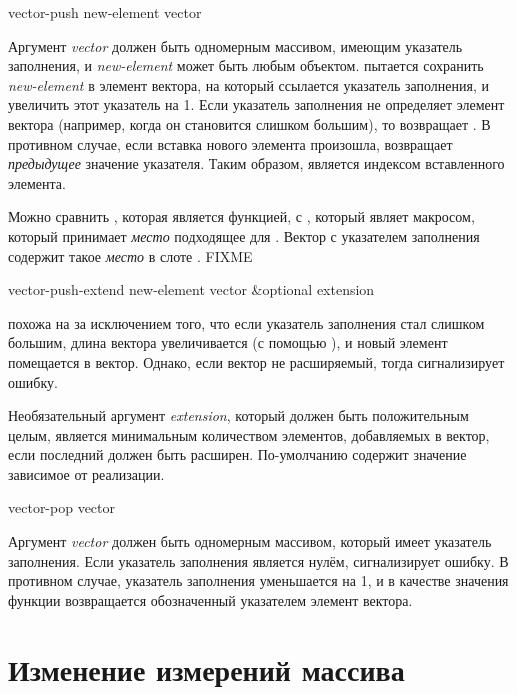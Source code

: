 \begin{defun}[Функция]
vector-push new-element vector

Аргумент \emph{vector} должен быть одномерным массивом, имеющим указатель
заполнения, и \emph{new-element} может быть любым объектом.
 пытается сохранить \emph{new-element} в элемент вектора, на
который ссылается указатель заполнения, и увеличить этот указатель на 1. Если
указатель заполнения не определяет элемент вектора (например, когда он
становится слишком большим), то  возвращает {\false}. В
противном случае, если вставка нового элемента произошла, 
возвращает \emph{предыдущее} значение указателя. Таким образом, 
является индексом вставленного элемента.

Можно сравнить , которая является функцией, с ,
который являет макросом, который принимает \emph{место} подходящее для
.
Вектор с указателем заполнения содержит такое \emph{место} в слоте
. FIXME
\end{defun}

\begin{defun}[Функция]
vector-push-extend new-element vector &optional extension

 похожа на  за исключением того, что
если указатель заполнения стал слишком большим, длина вектора увеличивается (с
помощью ), и новый элемент помещается в вектор.
Однако, если вектор не расширяемый, тогда  сигнализирует
ошибку.

Необязательный аргумент \emph{extension}, который должен быть положительным
целым, является минимальным количеством элементов, добавляемых в вектор, если
последний должен быть расширен. По-умолчанию содержит значение зависимое от
реализации.
\end{defun}

\begin{defun}[Функция]
vector-pop vector

Аргумент \emph{vector} должен быть одномерным массивом, который имеет указатель
заполнения.
Если указатель заполнения является нулём,  сигнализирует ошибку.
В противном случае, указатель заполнения уменьшается на 1, и в качестве значения
функции возвращается обозначенный указателем элемент вектора.
\end{defun}

\section{Изменение измерений массива}

